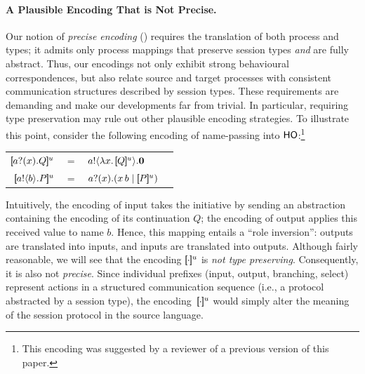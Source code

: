 \documentclass[runningheads]{llncs}
\begin{document}
{\paragraph{A Plausible Encoding That is Not Precise.}
Our notion of \emph{precise encoding} () 
requires the translation of both process and types; it  
admits only process mappings that preserve session types
\emph{and} are fully abstract. Thus, our encodings 
not only exhibit  strong behavioural correspondences, but also 
 relate source and target processes with consistent 
communication structures described by session types.
These requirements are demanding and make our developments far from trivial.
In particular, requiring type preservation may rule out other plausible encoding strategies.
To illustrate this point,
consider the  following  encoding of %
name-passing 
into $\mathsf{HO}$:\footnote{This encoding was suggested by a reviewer of a previous version of this paper.} %
\begin{center}
\begin{tabular}{rcll}
  $[\!\![a ? (x) . Q]\!\!]^u$	&$=$&	$a ! \langle \lambda x.\,[\!\![Q]\!\!]^u \rangle . \mathbf{0}$ \\
    $[\!\![a ! \langle b \rangle . P]\!\!]^u$	&$=$&	$a ? (x) .( x\, {b} \;|\; [\!\![P]\!\!]^u)$ 
\end{tabular}
\end{center}
{Intuitively, 
the encoding of input takes the initiative by sending an abstraction containing the encoding of its continuation $Q$;
the encoding of output applies this received value to name $b$.}
Hence, this mapping entails  a 
``role inversion'': outputs are translated into inputs, and inputs are translated into outputs. 
Although fairly reasonable, we will see that the encoding $[\!\![\cdot]\!\!]^u$  
is \emph{not type preserving}. Consequently, it is also not \emph{precise}.
Since individual prefixes (input, output, branching, select) 
represent actions in a structured communication sequence (i.e., a protocol abstracted by a session type),
the encoding~$[\!\![\cdot]\!\!]^u$ would simply alter the meaning of the session protocol in the source language.


}
\end{document}
